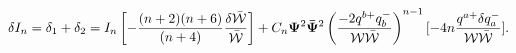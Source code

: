 \begin{equation}\label{rest_gen}
\delta I_{n}= \delta_{1} + \delta_{2}=
I_{n}\left[-{(n+2)(n+6)\over(n+4)}{\delta \bar{\cal W}\over
\bar{\cal W}}\right]  + C_{n}{\bf \Psi}^{2}{\bf
\bar\Psi}^{2}\left({-2q^{b +}q^{-}_{b}\over {\cal W}\bar{\cal
W}}\right)^{n-1}[-4n {q^{a +}\delta q^{-}_{a}\over {\cal
W}\bar{\cal W}}].
\end{equation}

